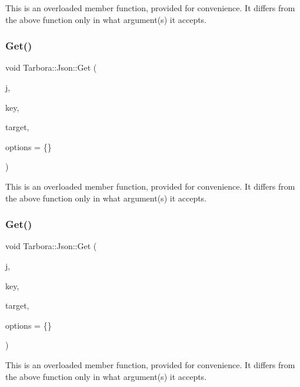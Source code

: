 This is an overloaded member function, provided for convenience. It differs from the above function only in what argument(s) it accepts. \mbox{\label{classTarbora_1_1Json_a050ea4e68695634b9d9719978faf35ba}} 
\subsubsection{\texorpdfstring{Get()}{Get()}\hspace{0.1cm}{\footnotesize\ttfamily [15/18]}}
{\footnotesize\ttfamily void Tarbora\+::\+Json\+::\+Get (\begin{DoxyParamCaption}\item[{raw\+\_\+json}]{j,  }\item[{int}]{key,  }\item[{int $\ast$}]{target,  }\item[{\hyperlink{structTarbora_1_1JsonOptions}{Json\+Options}}]{options = {\ttfamily \{\}} }\end{DoxyParamCaption})}

This is an overloaded member function, provided for convenience. It differs from the above function only in what argument(s) it accepts. \mbox{\label{classTarbora_1_1Json_adda98aedf5694912dae77700250872c1}} 
\subsubsection{\texorpdfstring{Get()}{Get()}\hspace{0.1cm}{\footnotesize\ttfamily [16/18]}}
{\footnotesize\ttfamily void Tarbora\+::\+Json\+::\+Get (\begin{DoxyParamCaption}\item[{raw\+\_\+json}]{j,  }\item[{int}]{key,  }\item[{float $\ast$}]{target,  }\item[{\hyperlink{structTarbora_1_1JsonOptions}{Json\+Options}}]{options = {\ttfamily \{\}} }\end{DoxyParamCaption})}

This is an overloaded member function, provided for convenience. It differs from the above function only in what argument(s) it accepts. \mbox{\label{classTarbora_1_1Json_ac3ceb8c8c992a316bdebed4924b4b2b0}} 
